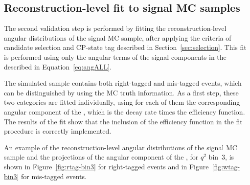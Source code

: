 


\subsection{Reconstruction-level fit to signal MC samples}
\label{sec:fitval-reco}

The second validation step is performed by fitting the reconstruction-level angular distributions of the signal MC sample, after applying the criteria of candidate selection and CP-state tag described in Section~\ref{sec:selection}.
This fit is performed using only the angular terms of the signal components in the \pdf described in Equation~\ref{eq:angALL}.

The simulated sample contains both right-tagged and mis-tagged events, which can be distinguished by using the MC truth information.
As a first step, these two categories are fitted individually, using for each of them the corresponding angular component of the \pdf, which is the decay rate times the efficiency function.
The results of the fit show that the inclusion of the efficiency function in the fit procedure is correctly implemented.

An example of the reconstruction-level angular distributions of the signal MC sample and the projections of the angular component of the \pdf, for $q^2$ bin~3, is shown in Figure~\ref{fig:rtag-bin3} for right-tagged events and in Figure~\ref{fig:wtag-bin3} for mis-tagged events.




